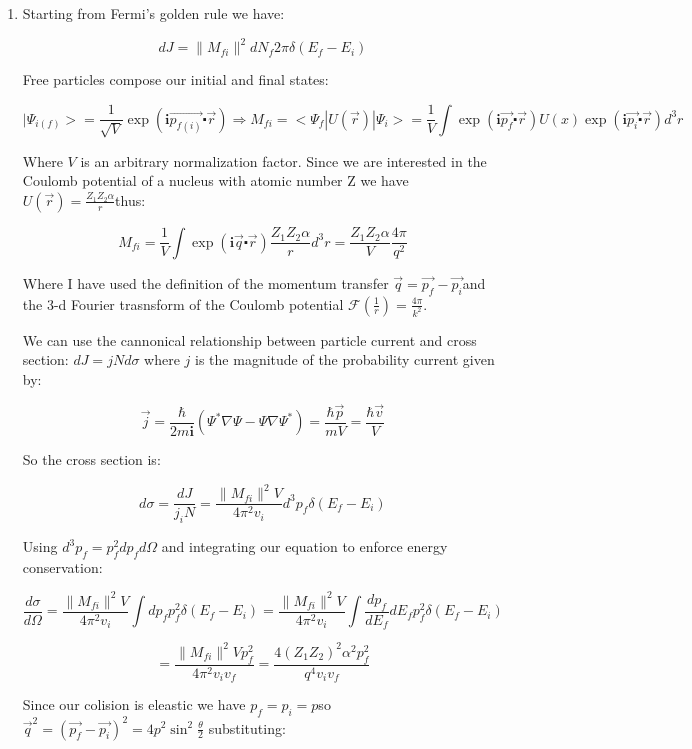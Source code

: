 \documentclass[fleqn, 12pt]{article}
\begin{document}
\begin{enumerate}
\item Starting from Fermi's golden rule we have:

\[
dJ=\|M_{fi}\|^{2}dN_{f}2\pi\delta\left(E_{f}-E_{i}\right)
\]


Free particles compose our initial and final states:

\[
{\displaystyle |\Psi_{i(f)}>}=\frac{1}{\sqrt{V}}\exp\left(\mathbf{i}\vec{p_{f(i)}}\centerdot\vec{r}\right)\Rightarrow M_{fi}=<\Psi_{f}|U(\vec{r})|\Psi_{i}>=\frac{1}{V}\int\exp\left(\mathbf{i}\vec{p_{f}}\centerdot\vec{r}\right)U(x)\exp\left(\mathbf{i}\vec{p_{i}}\centerdot\vec{r}\right)d^{3}r
\]


Where $V$ is an arbitrary normalization factor. Since we are interested
in the Coulomb potential of a nucleus with atomic number Z we have
$U(\vec{r})=\frac{Z_{1}Z_{2}\alpha}{r}$thus:

\[
M_{fi}=\frac{1}{V}\int\exp\left(\mathbf{i}\vec{q}\centerdot\vec{r}\right)\frac{Z_{1}Z_{2}\alpha}{r}d^{3}r=\frac{Z_{1}Z_{2}\alpha}{V}\frac{4\pi}{q^{2}}
\]


Where I have used the definition of the momentum transfer $\vec{q}=\vec{p_{f}}-\vec{p_{i}}$and
the 3-d Fourier trasnsform of the Coulomb potential $\mathcal{F}(\frac{1}{r})=\frac{4\pi}{k^{2}}$.

We can use the cannonical relationship between particle current and
cross section: $dJ=jNd\sigma$ where $j$ is the magnitude of the
probability current given by:

\[
\vec{j}=\frac{\hbar}{2m\mathbf{i}}\left(\Psi^{*}\nabla\Psi-\Psi\nabla\Psi^{*}\right)=\frac{\hbar\vec{p}}{mV}=\frac{\hbar\vec{v}}{V}
\]


So the cross section is:

\[
d\sigma=\frac{dJ}{j_{i}N}=\frac{\|M_{fi}\|^{2}V}{4\pi^{2}v_{i}}d^{3}p_{f}\delta\left(E_{f}-E_{i}\right)
\]


Using $d^{3}p_{f}=p_{f}^{2}dp_{f}d\Omega$ and integrating our equation
to enforce energy conservation:

\[
\frac{d\sigma}{d\Omega}=\frac{\|M_{fi}\|^{2}V}{4\pi^{2}v_{i}}\int dp_{f}p_{f}^{2}\delta(E_{f}-E_{i})=\frac{\|M_{fi}\|^{2}V}{4\pi^{2}v_{i}}\int\frac{dp_{f}}{dE_{f}}dE{}_{f}p_{f}^{2}\delta(E_{f}-E_{i})
\]


\[
=\frac{\|M_{fi}\|^{2}Vp_{f}^{2}}{4\pi^{2}v_{i}v_{f}}=\frac{4\left(Z_{1}Z_{2}\right)^{2}\alpha^{2}p_{f}^{2}}{q^{4}v_{i}v_{f}}
\]


Since our colision is eleastic we have $p_{f}=p_{i}=p$so $\vec{q}^{2}=\left(\vec{p_{f}}-\vec{p_{i}}\right)^{2}=4p^{2}\sin^{2}\frac{\theta}{2}$
substituting:


\end{enumerate}
\end{document}
